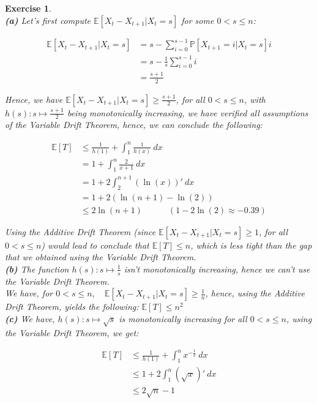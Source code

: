 \documentclass{article}
\newtheorem{exo}{Exercise}
\def\P{\mathbb{P}}
\def\E{\mathbb{E}}
\begin{document}
\begin{exo}{\ \\}
\noindent
\textbf{(a)} Let's first compute $\E[X_t-X_{t+1}| X_t =s]$ for some $0 <s \leq n$:

\begin{align*}
    \E[X_t-X_{t+1}| X_t =s] 
    &= s - \sum_{i = 0}^{s-1} \P[X_{t+1}=i| X_t =s] i \\
    &= s - \frac{1}{s} \sum_{i = 0}^{s-1} i \\
    &= \frac{s+1}{2} 
\end{align*}

Hence, we have $\E[X_t-X_{t+1}| X_t =s] \geq \frac{s+1}{2}$, for all $0 <s \leq n$, with $h(s): s \mapsto \frac{s+1}{2}$ being monotonically increasing, we have verified all assumptions of the Variable Drift Theorem, hence, we can conclude the following:

\begin{align*}
    \E[T]
    &\leq \frac{1}{h(1)} + \int_{{1}}^{{n}} {\frac{1}{h(x)} } \: d{x} \\
    &= 1 + \int_{{1}}^{{n}} {\frac{2}{x+1}} \: d{x} \\
    &= 1 + 2 \int_{{2}}^{{n+1}} {(\ln(x))'} \: d{x} \\
    &= 1 + 2(\ln(n+1)-\ln(2)) \\
    &\leq 2\ln(n+1) \quad \quad \quad ( 1 - 2\ln(2) \approx  -0.39 )
\end{align*}

Using the Additive Drift Theorem (since $\E[X_t-X_{t+1}| X_t =s] \geq 1$, for all $0 <s \leq n$) would lead to conclude that $\E[T] \leq n$, which is less tight than the gap that we obtained using the Variable Drift Theorem. \\

\noindent
\textbf{(b)} The function $h(s)\colon s \mapsto \frac{1}{s}$ isn't monotonically increasing, hence we can't use the Variable Drift Theorem. \\

We have, for $0 <  s \leq n, \quad \E[X_t-X_{t+1}| X_t=s] \geq \frac{1}{n}$, hence, using the Additive Drift Theorem, yields the following: $\E[T] \leq n^2$ \\

\noindent
\textbf{(c)} We have, $h(s): s \mapsto \sqrt{s}$ is monotonically increasing for all $0 < s \leq n$, using the Variable Drift Theorem, we get:

\begin{align*}
    \E[T]
    &\leq \frac{1}{h(1)} + \int_{{1}}^{{n}} {x^{-\frac{1}{2} }} \: d{x} \\
    &\leq 1 + 2 \int_{{1}}^{{n}} {(\sqrt{x})'} \: d{x} \\
    &\leq 2 \sqrt{n} - 1 
\end{align*}


\end{exo}
\end{document}
